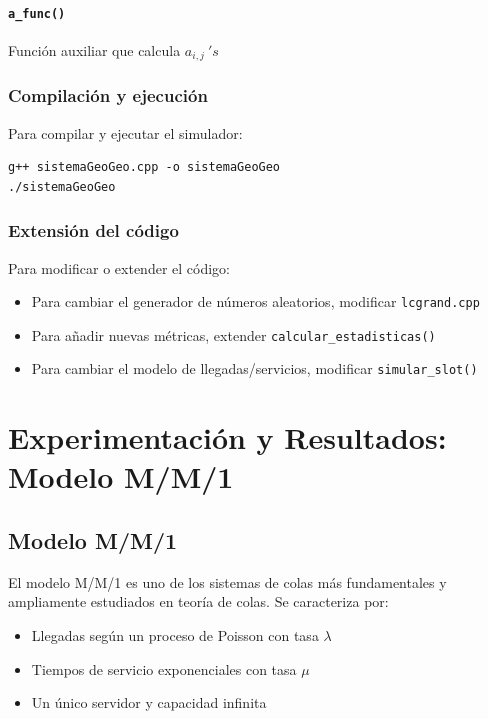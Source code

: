 \documentclass{article}
\begin{document}
\paragraph{\texttt{a\_func()}}
Función auxiliar que calcula $a_{i,j} \ 's$

\subsubsection{Compilación y ejecución}

Para compilar y ejecutar el simulador:

\begin{verbatim}
g++ sistemaGeoGeo.cpp -o sistemaGeoGeo 
./sistemaGeoGeo
\end{verbatim}

\subsubsection{Extensión del código}

Para modificar o extender el código:
\begin{itemize}
    \item Para cambiar el generador de números aleatorios, modificar \texttt{lcgrand.cpp}
    \item Para añadir nuevas métricas, extender \texttt{calcular\_estadisticas()}
    \item Para cambiar el modelo de llegadas/servicios, modificar \texttt{simular\_slot()}
\end{itemize}




\section{Experimentación y Resultados: Modelo M/M/1}\label{sec:exp}
\subsection{Modelo M/M/1}

El modelo M/M/1 es uno de los sistemas de colas más fundamentales y ampliamente estudiados en teoría de colas. Se caracteriza por:
\begin{itemize}
    \item Llegadas según un proceso de Poisson con tasa $\lambda$
    \item Tiempos de servicio exponenciales con tasa $\mu$
    \item Un único servidor y capacidad infinita
\end{itemize}
\end{document}
